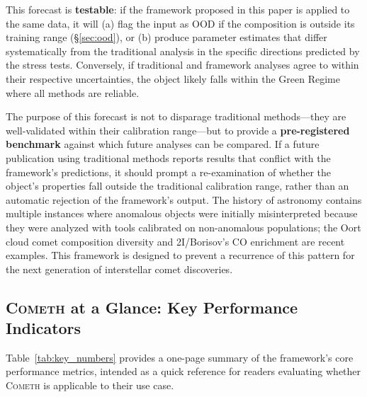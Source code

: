 \documentclass[preprint2]{aastex631}
\begin{document}
This forecast is \textbf{testable}: if the framework proposed in this paper is applied to the same data, it will (a) flag the input as OOD if the composition is outside its training range (\S\ref{sec:ood}), or (b) produce parameter estimates that differ systematically from the traditional analysis in the specific directions predicted by the stress tests. Conversely, if traditional and framework analyses agree to within their respective uncertainties, the object likely falls within the Green Regime where all methods are reliable.

The purpose of this forecast is not to disparage traditional methods---they are well-validated within their calibration range---but to provide a \textbf{pre-registered benchmark} against which future analyses can be compared. If a future publication using traditional methods reports results that conflict with the framework's predictions, it should prompt a re-examination of whether the object's properties fall outside the traditional calibration range, rather than an automatic rejection of the framework's output. The history of astronomy contains multiple instances where anomalous objects were initially misinterpreted because they were analyzed with tools calibrated on non-anomalous populations; the Oort cloud comet composition diversity and 2I/Borisov's CO enrichment are recent examples. This framework is designed to prevent a recurrence of this pattern for the next generation of interstellar comet discoveries.

\subsection{\texorpdfstring{\textsc{Cometh}}{COMETH} at a Glance: Key Performance Indicators}

Table~\ref{tab:key_numbers} provides a one-page summary of the framework's core performance metrics, intended as a quick reference for readers evaluating whether \textsc{Cometh} is applicable to their use case.
\end{document}
